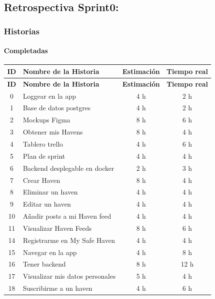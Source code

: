 \subsection{Retrospectiva Sprint0:}
\subsubsection{Historias}
\paragraph{Completadas}

\begin{center}
\renewcommand{\arraystretch}{1.3} %
\begin{longtable}{|c|p{7cm}|c|c|}
\hline
\textbf{ID} & \textbf{Nombre de la Historia} & \textbf{Estimación} & \textbf{Tiempo real} \\
\hline
\endfirsthead

\hline
\textbf{ID} & \textbf{Nombre de la Historia} & \textbf{Estimación} & \textbf{Tiempo real} \\
\hline
\endhead

0  & Loggear en la app                     & 4 h  & 2 h \\
\hline
1  & Base de datos postgres                         & 4 h  & 2 h  \\
\hline
2  & Mockups Figma         & 8 h  & 6 h  \\
\hline
3 & Obtener mis Havens               & 8 h & 4 h \\
\hline
4 & Tablero trello                       & 4 h  & 6 h  \\
\hline
5 & Plan de sprint                        & 4 h  & 4 h  \\
\hline
6 & Backend desplegable en docker                    & 2 h  & 3 h  \\
\hline
7 & Crear Haven                          & 8 h  & 4 h  \\
\hline
8 & Eliminar un haven        & 4 h  & 4 h  \\
\hline
9 & Editar un haven          & 4 h  & 4 h  \\
\hline
10 & Añadir posts a mi Haven feed                        & 4 h  & 4 h  \\
\hline
11 & Visualizar Haven Feeds                        & 8 h  & 6 h  \\
\hline
14 & Registrarme en My Safe Haven                        & 4 h  & 4 h  \\
\hline
15 & Navegar en la app                        & 4 h  & 8 h  \\
\hline
16 & Tener backend                        & 8 h  & 12 h  \\
\hline
17 & Visualizar mis datos personales                        & 5 h  & 4 h  \\
\hline
18 & Suscribirme a un haven                        & 4 h  & 6 h  \\
\hline


\end{longtable}
\end{center}

